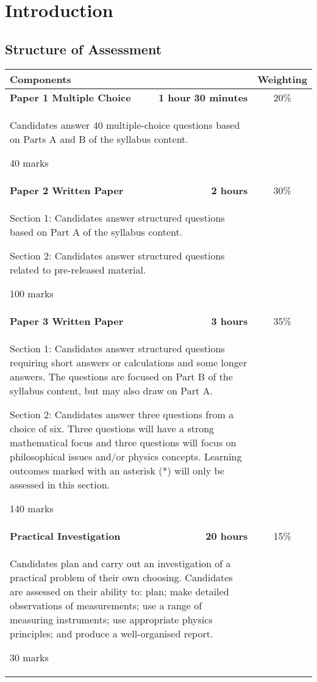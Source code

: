\documentclass[main.tex]{subfiles}
\begin{document}
\chapter{Introduction}
\section{Structure of Assessment}
\begin{table}[ht]
  \begin{tabular}{|lr|c|}
    \hline
    \textbf{Components} & & \textbf{Weighting} \\
    \hline
    \textbf{Paper 1 Multiple Choice} & \textbf{1 hour 30 minutes} & 20\% \\
    \multicolumn{2}{|p{10cm}|}{Candidates answer 40 multiple-choice questions based on Parts A and B of the syllabus content.

40 marks} & \\ \hline
\textbf{Paper 2 Written Paper} & \textbf{2 hours} & 30\% \\
\multicolumn{2}{|p{10cm}|}{Section 1: Candidates answer structured questions based on Part A of the syllabus
content.

Section 2: Candidates answer structured questions related to pre-released material.

100 marks} & \\ \hline
\textbf{Paper 3 Written Paper} & \textbf{3 hours} & 35\% \\
\multicolumn{2}{|p{10cm}|}{Section 1: Candidates answer structured questions requiring short answers or calculations and some longer answers. The questions are focused on Part B of the syllabus content, but may also draw on Part A.

Section 2: Candidates answer three questions from a choice of six. Three questions will have a strong mathematical focus and three questions will focus on philosophical issues and/or physics concepts. Learning outcomes marked with an asterisk (*) will only be assessed in this section.

140 marks} & \\ \hline
\textbf{Practical Investigation} & \textbf{20 hours} & 15\% \\
\multicolumn{2}{|p{10cm}|}{Candidates plan and carry out an investigation of a practical problem of their own choosing. Candidates are assessed on their ability to: plan; make detailed observations of measurements; use a range of measuring instruments; use appropriate physics principles; and produce a well-organised report.

30 marks} & \\ \hline
  \end{tabular}
\end{table}
\end{document}
